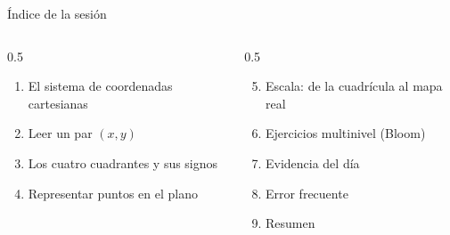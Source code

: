 \documentclass[aspectratio=169, 10pt, spanish]{beamer}
\begin{document}
\begin{frame}[plain]
  \titlepage
\end{frame}

\begin{frame}{Índice de la sesión}
  \begin{columns}[t]
    \begin{column}{0.5\textwidth}
      \begin{enumerate}
        \item El sistema de coordenadas cartesianas
        \item Leer un par $(x, y)$
        \item Los cuatro cuadrantes y sus signos
        \item Representar puntos en el plano
      \end{enumerate}
    \end{column}
    \begin{column}{0.5\textwidth}
      \begin{enumerate}
        \setcounter{enumi}{4}
        \item Escala: de la cuadrícula al mapa real
        \item Ejercicios multinivel (Bloom)
        \item Evidencia del día
        \item Error frecuente
        \item Resumen
      \end{enumerate}
    \end{column}
  \end{columns}
\end{frame}

\end{document}
